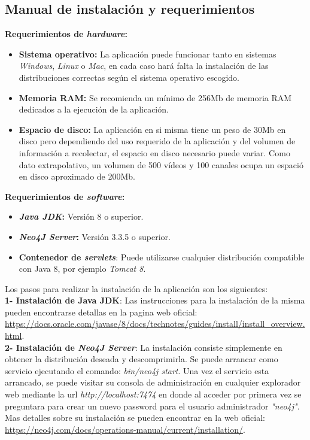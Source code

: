 \documentclass[11pt,a4paper]{article}
\begin{document}
\subsection{Manual de instalación y requerimientos}\label{Manual} 
\noindent\textbf{Requerimientos de \textit{hardware}:}
\begin{itemize}
\item \textbf{Sistema operativo:} La aplicación puede funcionar tanto en sistemas \textit{Windows}, \textit{Linux} o \textit{Mac}, en cada caso hará falta la instalación de las distribuciones correctas según el sistema operativo escogido.
\item \textbf{Memoria RAM:} Se recomienda un mínimo de 256Mb de memoria RAM dedicados a la ejecución de la aplicación.
\item \textbf{Espacio de disco:} La aplicación en si misma tiene un peso de 30Mb en disco pero dependiendo del uso requerido de la aplicación y del volumen de información a recolectar, el espacio en disco necesario puede variar. Como dato extrapolativo, un volumen de 500 vídeos y 100 canales ocupa un espació en disco aproximado de 200Mb.
\end{itemize}

\noindent\textbf{Requerimientos de \textit{software}:}
\begin{itemize}
\item \textbf{\textit{Java JDK}:} Versión 8 o superior.
\item \textbf{\textit{Neo4J Server}:} Versión 3.3.5 o superior.
\item \textbf{Contenedor de \textit{servlets}}: Puede utilizarse cualquier distribución compatible con Java 8, por ejemplo \textit{Tomcat 8}.
\end{itemize}
\bigskip 

Los pasos para realizar la instalación de la aplicación son los siguientes:
\\

\noindent\textbf{1- Instalación de Java JDK}: Las instrucciones para la instalación de la misma pueden encontrarse detallas en la pagina web oficial: \url{https://docs.oracle.com/javase/8/docs/technotes/guides/install/install_overview.html}.
\\

\noindent\textbf{2- Instalación de \textit{Neo4J Server}}: La instalación consiste simplemente en obtener la distribución deseada y descomprimirla. Se puede arrancar como servicio ejecutando el comando: \textit{bin/neo4j start}. Una vez el servicio esta arrancado, se puede visitar su consola de administración en cualquier explorador web mediante la url  \textit{http://localhost:7474} en donde al acceder por primera vez se preguntara para crear un nuevo password para el usuario administrador \textit{"neo4j"}. Mas detalles sobre su instalación se pueden encontrar en la web oficial: \url{https://neo4j.com/docs/operations-manual/current/installation/}.
\\
\end{document}
